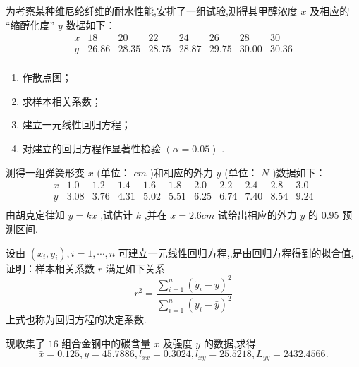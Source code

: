 \begin{xiti}
    \item 为考察某种维尼纶纤维的耐水性能,安排了一组试验,测得其甲醇浓度 $x$ 及相应的
    “缩醇化度” $y$ 数据如下：
    \begin{equation}
    \begin{array}{c|ccccccc}
    x     & 18    & 20    & 22    & 24    & 26    & 28    & 30 \\\hline
    y     & 26.86  & 28.35  & 28.75  & 28.87  & 29.75  & 30.00  & 30.36  \\
    \end{array}%
    \end{equation}
    \begin{enumerate}
        \item 作散点图；
        \item 求样本相关系数；
        \item 建立一元线性回归方程；
        \item 对建立的回归方程作显著性检验 $(\alpha=0.05)$ .
    \end{enumerate}
    \item 测得一组弹簧形变 $x$ (单位： $cm$ )和相应的外力 $y$ (单位： $N$ )数据如下：%
    \begin{equation}
    \begin{array}{c|cccccccccc}
    x     & 1.0   & 1.2   & 1.4   & 1.6   & 1.8   & 2.0   & 2.2   & 2.4   & 2.8   & 3.0  \\\hline
    y     & 3.08  & 3.76  & 4.31  & 5.02  & 5.51  & 6.25  & 6.74  & 7.40  & 8.54  & 9.24  \\
    \end{array}%
    \end{equation}
    由胡克定律知 $y=kx$ ,试估计 $k$ ,并在 $x=2.6cm$ 试给出相应的外力 $y$ 的 $0.95$ 预测区间.
    \item 设由 $(x_i,y_i),i=1,\cdots,n$ 可建立一元线性回归方程,,是由回归方程得到的拟合值,证明：样本相关系数 $r$ 满足如下关系
    \begin{equation}
    r^{2}=\frac{\sum_{i=1}^{n}\left(\dot{y}_{i}-\bar{y}\right)^{2}}{\sum_{i=1}^{n}\left(y_{i}-\bar{y}\right)^{2}}
    \end{equation}
    上式也称为回归方程的决定系数.
    \item 现收集了 $16$ 组合金钢中的碳含量 $x$ 及强度 $y$ 的数据,求得
    \begin{equation}
    \bar{x}=0.125,y=45.7886,l_{xx}=0.3024,l_{xy}=25.5218,L_{yy}=2432.4566.
    \end{equation}

\end{xiti}
